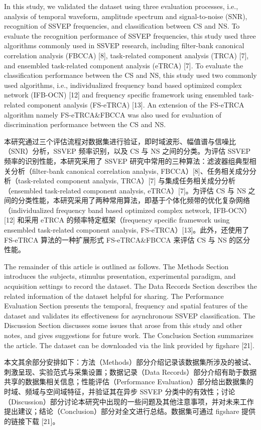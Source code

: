 \documentclass[11pt]{ctexart}
\newenvironment{en}{\begin{enbox}\color{black!85}}{\end{enbox}}
\newenvironment{zh}{\begin{zhbox}}{\end{zhbox}}
\begin{document}
\begin{en}
In this study, we validated the dataset using three evaluation processes, i.e., analysis of temporal waveform, amplitude spectrum and signal-to-noise (SNR), recognition of SSVEP frequencies, and classification between CS and NS. To evaluate the recognition performance of SSVEP frequencies, this study used three algorithms commonly used in SSVEP research, including filter-bank canonical correlation analysis (FBCCA) [8], task-related component analysis (TRCA) [7], and ensembled task-related component analysis (eTRCA) [7]. To evaluate the classification performance between the CS and NS, this study used two commonly used algorithms, i.e., individualized frequency band based optimized complex network (IFB-OCN) [12] and frequency specific framework using ensembled task-related component analysis (FS-eTRCA) [13]. An extension of the FS-eTRCA algorithm namely FS-eTRCA\&FBCCA was also used for evaluation of discrimination performance between the CS and NS.
\end{en}
\begin{zh}
本研究通过三个评估流程对数据集进行验证，即时域波形、幅值谱与信噪比（SNR）分析，SSVEP 频率识别，以及 CS 与 NS 之间的分类。为评估 SSVEP 频率的识别性能，本研究采用了 SSVEP 研究中常用的三种算法：滤波器组典型相关分析（filter-bank canonical correlation analysis, FBCCA）[8]、任务相关成分分析（task-related component analysis, TRCA）[7] 与集成任务相关成分分析（ensembled task-related component analysis, eTRCA）[7]。为评估 CS 与 NS 之间的分类性能，本研究采用了两种常用算法，即基于个体化频带的优化复杂网络（individualized frequency band based optimized complex network, IFB-OCN）[12] 和采用 eTRCA 的频率特定框架（frequency specific framework using ensembled task-related component analysis, FS-eTRCA）[13]。此外，还使用了 FS-eTRCA 算法的一种扩展形式 FS-eTRCA\&FBCCA 来评估 CS 与 NS 的区分性能。
\end{zh}

\begin{en}
The remainder of this article is outlined as follows. The Methods Section introduces the subjects, stimulus presentation, experimental paradigm, and acquisition settings to record the dataset. The Data Records Section describes the related information of the dataset helpful for sharing. The Performance Evaluation Section presents the temporal, frequency and spatial features of the dataset and validates its effectiveness for asynchronous SSVEP classification. The Discussion Section discusses some issues that arose from this study and other notes, and gives suggestions for future work. The Conclusion Section summarizes the article. The dataset can be downloaded via the link provided by figshare [21].
\end{en}
\begin{zh}
本文其余部分安排如下：方法（Methods）部分介绍记录该数据集所涉及的被试、刺激呈现、实验范式与采集设置；数据记录（Data Records）部分介绍有助于数据共享的数据集相关信息；性能评估（Performance Evaluation）部分给出数据集的时域、频域与空间域特征，并验证其在异步 SSVEP 分类中的有效性；讨论（Discussion）部分讨论本研究中出现的一些问题及其他注意事项，并对未来工作提出建议；结论（Conclusion）部分对全文进行总结。数据集可通过 figshare 提供的链接下载 [21]。
\end{zh}
\end{document}
